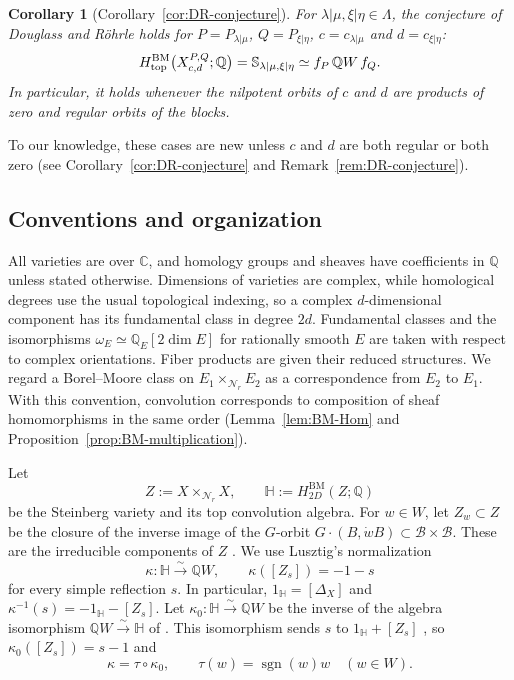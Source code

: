 \documentclass[11pt,a4paper]{amsart}
\newtheorem{introcor}[introthm]{Corollary}
\theoremstyle{definition}
\theoremstyle{remark}
\newcommand{\C}{\mathbb C}
\newcommand{\Q}{\mathbb Q}
\newcommand{\N}{\mathcal N}
\newcommand{\B}{\mathcal B}
\newcommand{\bS}{\mathbb S}
\newcommand{\bH}{\mathbb H}
\newcommand{\BM}{\mathrm{BM}}
\newcommand{\sgn}{\operatorname{sgn}}
\newcommand{\lm}{\lambda|\mu}
\newcommand{\xh}{\xi|\eta}
\numberwithin{equation}{section}
\begin{document}
\begin{introcor}[Corollary~\ref{cor:DR-conjecture}]\label{cor:intro-DR}
For $\lm,\xh\in\Lambda$, the conjecture of Douglass and R\"ohrle holds
for $P=P_{\lm}$, $Q=P_{\xh}$, $c=c_{\lm}$ and $d=c_{\xh}$: 
$$
H^{\BM}_{\rm top}\bigl(X^{P,Q}_{c,d};\Q\bigr)=\bS_{\lm,\xh}\simeq
f_P\,\Q W\,f_Q.
$$
In particular, it holds whenever the nilpotent orbits of $c$ and $d$ are products of
zero and regular orbits of the blocks.
\end{introcor}

To our knowledge, these cases are new unless $c$ and $d$ are both
regular or both zero (see Corollary~\ref{cor:DR-conjecture} and
Remark~\ref{rem:DR-conjecture}).

\subsection{Conventions and organization}
\label{sec:conventions}
All varieties are over $\C$, and homology groups and sheaves have
coefficients in $\Q$ unless stated otherwise. Dimensions of varieties
are complex, while homological degrees use the usual topological
indexing, so a complex $d$-dimensional component has its fundamental
class in degree $2d$. Fundamental classes and the isomorphisms
$\omega_E\simeq\Q_E[2\dim E]$ for rationally smooth $E$ are taken with
respect to complex orientations. Fiber products are given their reduced
structures. We regard a Borel--Moore class on $E_1\times_{\N_r}E_2$ as a
correspondence from $E_2$ to $E_1$. With this convention, convolution
corresponds to composition of sheaf homomorphisms in the same order
(Lemma~\ref{lem:BM-Hom} and Proposition~\ref{prop:BM-multiplication}).

Let
$$
Z:=X\times_{\N_r}X,\qquad \bH:=H^{\BM}_{2D}(Z;\Q)
$$
be the Steinberg variety and its top convolution algebra. For $w\in W$,
let $Z_w\subset Z$ be the closure of the inverse image of the $G$-orbit
$G\cdot(B,\dot wB)\subset\B\times\B$. These are the irreducible
components of $Z$ \cite[Section~3.3]{CG}. We use Lusztig's
normalization
\begin{equation}\label{eq:Lusztig-normalization}
\kappa:\bH\xrightarrow{\sim}\Q W,\qquad \kappa([Z_s])=-1-s
\end{equation}
for every simple reflection $s$. In particular, $1_{\bH}=[\Delta_X]$ and
$\kappa^{-1}(s)=-1_{\bH}-[Z_s]$. Let $\kappa_0:\bH\xrightarrow{\sim}\Q W$ be
the inverse of the algebra isomorphism $\Q W\xrightarrow{\sim}\bH$ of
\cite[Section~3.4]{CG}. This isomorphism sends $s$ to $1_{\bH}+[Z_s]$
\cite[Theorem~3.9(a)]{DRsurvey}, so $\kappa_0([Z_s])=s-1$ and
\begin{equation}\label{eq:tau}
\kappa=\tau\circ\kappa_0,\qquad
\tau(w)=\sgn(w)w\quad(w\in W).
\end{equation}
\end{document}
